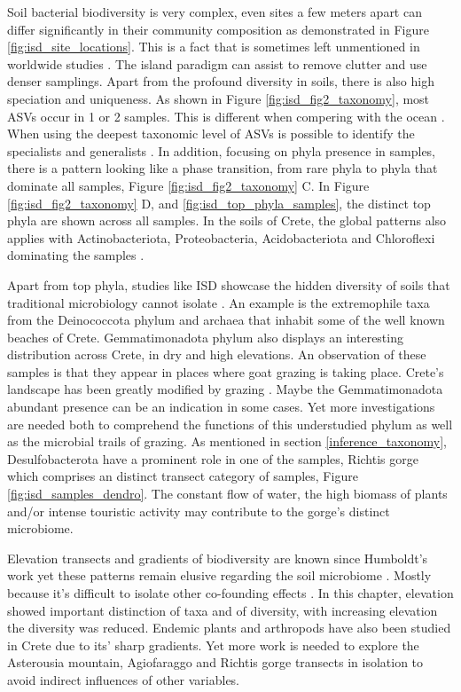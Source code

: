 Soil bacterial biodiversity is very complex, even sites a few meters apart can differ
significantly in their community composition as demonstrated in Figure \ref{fig:isd_site_locations}.
This is a fact that is sometimes left unmentioned in worldwide studies \parencite{Bahram2018}.
The island paradigm can assist to remove clutter and use denser samplings.
Apart from the profound diversity in soils, there is also high speciation and uniqueness. 
As shown in Figure \ref{fig:isd_fig2_taxonomy}, most ASVs occur in 1 or 2 samples.
This is different when compering with the ocean \parencite{Sunagawa2015}. When using the deepest taxonomic
level of ASVs is possible to identify the specialists and generalists \parencite{Barberan2012}. 
In addition, focusing on phyla presence in samples, there is a pattern looking like a phase transition, from 
rare phyla to phyla that dominate all samples, Figure \ref{fig:isd_fig2_taxonomy} C.
In Figure \ref{fig:isd_fig2_taxonomy} D,
and \ref{fig:isd_top_phyla_samples}, the distinct top phyla are shown across all samples.
In the soils of Crete, the global patterns also applies with Actinobacteriota,
Proteobacteria, Acidobacteriota and Chloroflexi dominating the samples \parencite{Delgado-Baquerizo-atlas}.

Apart from top phyla, studies like ISD showcase the hidden diversity of soils 
that traditional microbiology cannot isolate \parencite{gilbert2014earth}. 
An example is the extremophile taxa from the Deinococcota phylum and archaea that
inhabit some of the well known beaches of Crete.
Gemmatimonadota phylum also displays an interesting distribution across Crete, 
in dry and high elevations. An observation of these samples is that they 
appear in places where goat grazing is taking place. Crete's landscape 
has been greatly modified by grazing \parencite{JouffroyBapicot2016}.
Maybe the Gemmatimonadota abundant presence can be an indication in some cases.
Yet more investigations are needed both to comprehend the functions of this understudied phylum as well as the 
microbial trails of grazing.
As mentioned in section \ref{inference_taxonomy},
Desulfobacterota have a prominent role in one of the samples, Richtis gorge which
comprises an distinct transect category of samples, Figure \ref{fig:isd_samples_dendro}.
The constant flow of water, the high biomass of plants and/or intense touristic activity may
contribute to the gorge's distinct microbiome. 

Elevation transects and gradients of biodiversity are known since Humboldt's work \parencite{Rahbek2019} 
yet these patterns remain elusive regarding the soil microbiome \parencite{Looby2020, Siles2023}.
Mostly because it's difficult to isolate other co-founding effects \parencite{Nottingham2018}.
In this chapter, elevation showed important distinction of taxa and of diversity, 
with increasing elevation the diversity was reduced. Endemic plants \parencite{trigas2013elevational}
and arthropods \parencite{sfenthourakis2001hotspots} have also been studied in Crete due to its' sharp gradients.
Yet more work is needed to explore the Asterousia mountain, Agiofaraggo and Richtis gorge transects in isolation to avoid indirect influences of 
other variables.

